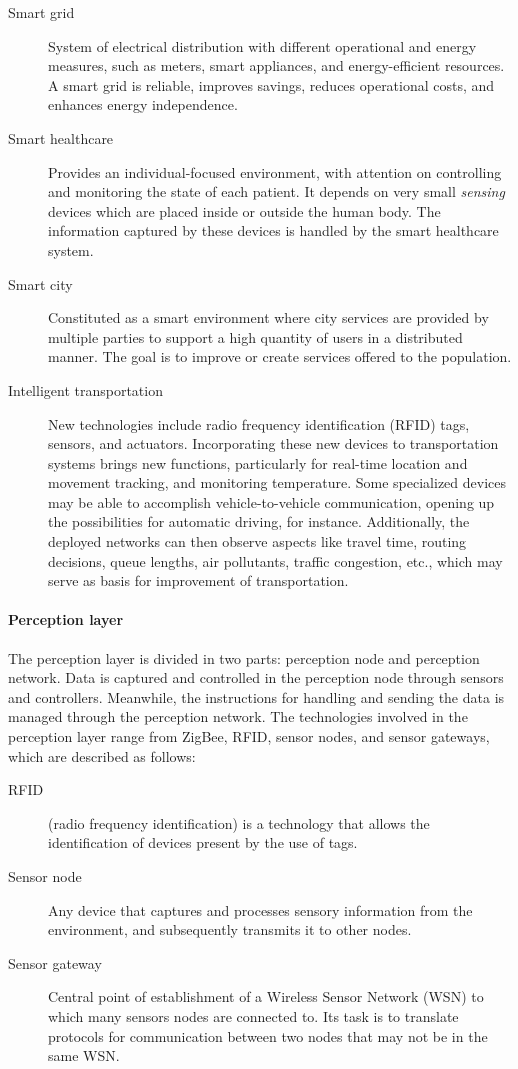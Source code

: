 \documentclass[12pt]{article}
\begin{document}
\begin{description}
\item [Smart grid] System of electrical distribution with different operational and energy measures, such as meters, smart appliances, and energy-efficient resources. A smart grid is reliable, improves savings, reduces operational costs, and enhances energy independence. 
\item [Smart healthcare] Provides an individual-focused environment, with attention on controlling and monitoring the state of each patient. It depends on very small \emph{sensing} devices which are placed inside or outside the human body. The information captured by these devices is handled by the smart healthcare system.
\item [Smart city] Constituted as a smart environment where city services are provided by multiple parties to support a high quantity of users in a distributed manner. The goal is to improve or create services offered to the population.
\item [Intelligent transportation] New technologies include radio frequency identification (RFID) tags, sensors, and actuators. Incorporating these new devices to transportation systems brings new functions, particularly for real-time location and movement tracking, and monitoring temperature. Some specialized devices may be able to accomplish vehicle-to-vehicle communication, opening up the possibilities for automatic driving, for instance. Additionally, the deployed networks can then observe aspects like travel time, routing decisions, queue lengths, air pollutants, traffic congestion, etc., which may serve as basis for improvement of transportation.
\end{description}

\paragraph{Perception layer} The perception layer is divided in two parts: perception node and perception network. Data is captured and controlled in the perception node through sensors and controllers. Meanwhile, the instructions for handling and sending the data is managed through the perception network. The technologies involved in the perception layer range from ZigBee, RFID, sensor nodes, and sensor gateways, which are described as follows:

\begin{description}
\item [RFID] (radio frequency identification) is a technology that allows the identification of devices present by the use of tags. 
\item [Sensor node] Any device that captures and processes sensory information from the environment, and subsequently transmits it to other nodes.
\item [Sensor gateway] Central point of establishment of a Wireless Sensor Network (WSN) to which many sensors nodes are connected to. Its task is to translate protocols for communication between two nodes that may not be in the same WSN.
\end{description}
\end{document}
